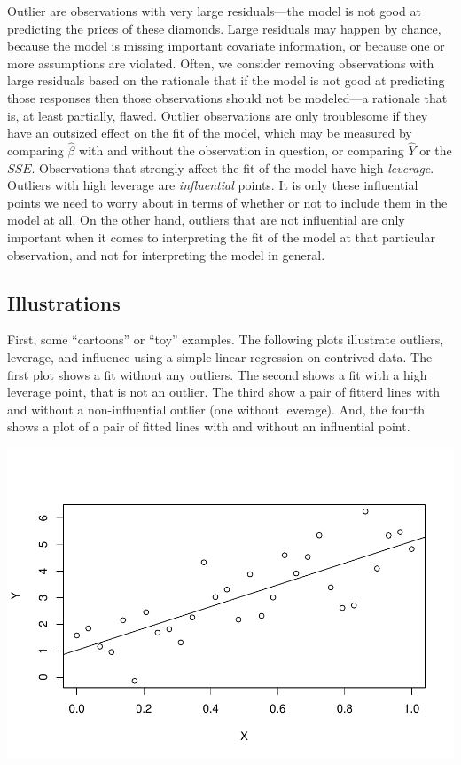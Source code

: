 \documentclass[
]{book}
\begin{document}
Outlier are observations with very large residuals---the model is not good at predicting the prices of these diamonds. Large residuals may happen by chance, because the model is missing important covariate information, or because one or more assumptions are violated. Often, we consider removing observations with large residuals based on the rationale that if the model is not good at predicting those responses then those observations should not be modeled---a rationale that is, at least partially, flawed. Outlier observations are only troublesome if they have an outsized effect on the fit of the model, which may be measured by comparing \(\hat\beta\) with and without the observation in question, or comparing \(\hat Y\) or the \(SSE\). Observations that strongly affect the fit of the model have high \emph{leverage}. Outliers with high leverage are \emph{influential} points. It is only these influential points we need to worry about in terms of whether or not to include them in the model at all. On the other hand, outliers that are not influential are only important when it comes to interpreting the fit of the model at that particular observation, and not for interpreting the model in general.

\hypertarget{illustrations}{%
\subsection{Illustrations}\label{illustrations}}

First, some ``cartoons'' or ``toy'' examples. The following plots illustrate outliers, leverage, and influence using a simple linear regression on contrived data. The first plot shows a fit without any outliers. The second shows a fit with a high leverage point, that is not an outlier. The third show a pair of fitterd lines with and without a non-influential outlier (one without leverage). And, the fourth shows a plot of a pair of fitted lines with and without an influential point.

\includegraphics{13-MultipleLinearRegression_files/figure-latex/unnamed-chunk-13-1.pdf}
\end{document}
